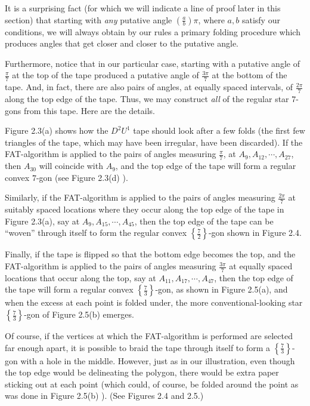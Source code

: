 It is a surprising fact (for which we will indicate a line of proof later in this section) that starting with \emph{any} putative angle $\left( \frac{a}{b} \right) \pi$, where $a,b$ satisfy our conditions, we will always obtain by our rules a primary folding procedure which produces angles that get closer and closer to the putative angle.

Furthermore, notice that in our particular case, starting with a putative angle of $\frac{\pi}{7}$ at the top of the tape produced a putative angle of $\frac{3\pi}{7}$ at the bottom of the tape. And, in fact, there are also pairs of angles, at equally spaced intervals, of $\frac{2\pi}{7}$ along the top edge of the tape. Thus, we may construct \emph{all} of the regular star $7$-gons from this tape. Here are the details.

Figure 2.3(a) shows how the $D^{2} U^{1}$ tape should look after a few folds (the first few triangles of the tape, which may have been irregular, have been discarded). If the FAT-algorithm is applied to the pairs of angles measuring $\frac{\pi}{7}$, at $A_{9}, A_{12}, \cdots, A_{27}$, then $A_{30}$ will coincide with $A_{9}$, and the top edge of the tape will form a regular convex $7$-gon (see Figure 2.3(d) ). 

Similarly, if the FAT-algorithm is applied to the pairs of angles measuring $\frac{2\pi}{7}$ at suitably spaced locations where they occur along the top edge of the tape in Figure 2.3(a), say at $A_{9}, A_{15}, \cdots, A_{45}$, then the top edge of the tape can be ``woven'' through itself to form the regular convex $\left\{ \frac{7}{2} \right\}$-gon shown in Figure 2.4.

Finally, if the tape is flipped so that the bottom edge becomes the top, and the FAT-algorithm is applied to the pairs of angles measuring $\frac{3\pi}{7}$ at equally spaced locations that occur along the top, say at $A_{11}, A_{17}, \cdots, A_{47}$, then the top edge of the tape will form a regular convex $\left\{ \frac{7}{3} \right\}$-gon, as shown in Figure 2.5(a), and when the excess at each point is folded under, the more conventional-looking star $\left\{ \frac{7}{3} \right\}$-gon of Figure 2.5(b) emerges. 

Of course, if the vertices at which the FAT-algorithm is performed are selected far enough apart, it is possible to braid the tape through itself to form a $\left\{ \frac{7}{3} \right\}$-gon with a hole in the middle. However, just as in our illustration, even though the top edge would be delineating the polygon, there would be extra paper sticking out at each point (which could, of course, be folded around the point as was done in Figure 2.5(b) ). (See Figures 2.4 and 2.5.)

